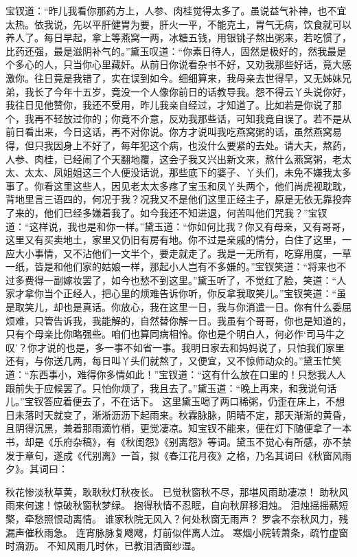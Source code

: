 \documentclass[12pt,oneside]{book}
\begin{document}
宝钗道：“昨儿我看你那药方上，人参、肉桂觉得太多了。虽说益气补神，也不宜太热。依我说，先以平肝健胃为要，肝火一平，不能克土，胃气无病，饮食就可以养人了。每日早起，拿上等燕窝一两，冰糖五钱，用银铫子熬出粥来，若吃惯了，比药还强，最是滋阴补气的。”黛玉叹道：“你素日待人，固然是极好的，然我最是个多心的人，只当你心里藏奸。从前日你说看杂书不好，又劝我那些好话，竟大感激你。往日竟是我错了，实在误到如今。细细算来，我母亲去世得早，又无姊妹兄弟，我长了今年十五岁，竟没一个人像你前日的话教导我。怨不得云丫头说你好，我往日见他赞你，我还不受用，昨儿我亲自经过，才知道了。比如若是你说了那个，我再不轻放过你的；你竟不介意，反劝我那些话，可知我竟自误了。若不是从前日看出来，今日这话，再不对你说。你方才说叫我吃燕窝粥的话，虽然燕窝易得，但只我因身上不好了，每年犯这个病，也没什么要紧的去处。请大夫，熬药，人参、肉桂，已经闹了个天翻地覆，这会子我又兴出新文来，熬什么燕窝粥，老太太、太太、凤姐姐这三个人便没话说，那些底下的婆子、丫头们，未免不嫌我太多事了。你看这里这些人，因见老太太多疼了宝玉和凤丫头两个，他们尚虎视耽耽，背地里言三语四的，何况于我？况我又不是他们这里正经主子，原是无依无靠投奔了来的，他们已经多嫌着我了。如今我还不知进退，何苦叫他们咒我？”宝钗道：“这样说，我也是和你一样。”黛玉道：“你如何比我？你又有母亲，又有哥哥，这里又有买卖地土，家里又仍旧有房有地。你不过是亲戚的情分，白住了这里，一应大小事情，又不沾他们一文半个，要走就走了。我是一无所有，吃穿用度，一草一纸，皆是和他们家的姑娘一样，那起小人岂有不多嫌的。”宝钗笑道：“将来也不过多费得一副嫁妆罢了，如今也愁不到这里。”黛玉听了，不觉红了脸，笑道：“人家才拿你当个正经人，把心里的烦难告诉你听，你反拿我取笑儿。”宝钗笑道：“虽是取笑儿，却也是真话。你放心，我在这里一日，我与你消遣一日。你有什么委屈烦难，只管告诉我，我能解的，自然替你解一日。我虽有个哥哥，你也是知道的，只有个母亲比你略强些。咱们也算同病相怜。你也是个明白人，何必作‘司马牛之叹’？你才说的也是，多一事不如省一事。我明日家去和妈妈说了，只怕我们家里还有，与你送几两，每日叫丫头们就熬了，又便宜，又不惊师动众的。”黛玉忙笑道：“东西事小，难得你多情如此！”宝钗道：“这有什么放在口里的！只愁我人人跟前失于应候罢了。只怕你烦了，我且去了。”黛玉道：“晚上再来，和我说句话儿。”宝钗答应着便去了，不在话下。
这里黛玉喝了两口稀粥，仍歪在床上，不想日未落时天就变了，淅淅沥沥下起雨来。秋霖脉脉，阴晴不定，那天渐渐的黄昏，且阴得沉黑，兼着那雨滴竹梢，更觉凄凉。知宝钗不能来，便在灯下随便拿了一本书，却是《乐府杂稿》，有《秋闺怨》《别离怨》等词。黛玉不觉心有所感，亦不禁发于章句，遂成《代别离》一首，拟《春江花月夜》之格，乃名其词曰《秋窗风雨夕》。其词曰：

秋花惨淡秋草黄，耿耿秋灯秋夜长。
已觉秋窗秋不尽，那堪风雨助凄凉！
助秋风雨来何速！惊破秋窗秋梦绿。
抱得秋情不忍眠，自向秋屏移泪烛。
泪烛摇摇爇短檠，牵愁照恨动离情。
谁家秋院无风入？何处秋窗无雨声？
罗衾不奈秋风力，残漏声催秋雨急。
连宵脉脉复飕飕，灯前似伴离人泣。
寒烟小院转萧条，疏竹虚窗时滴沥。
不知风雨几时休，已教泪洒窗纱湿。
\end{document}
